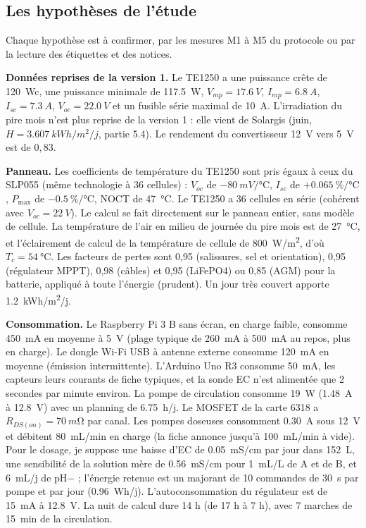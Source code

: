 \subsection{Les hypothèses de l'étude}

Chaque hypothèse est à confirmer, par les mesures M1 à M5 du protocole ou par la lecture des étiquettes et des notices.

\textbf{Données reprises de la version 1.} Le TE1250 a une puissance crête de \qty{120}{Wc}, une puissance minimale de \qty{117,5}{W}, $V_{mp} = \qty{17,6}{V}$, $I_{mp} = \qty{6,8}{A}$, $I_{sc} = \qty{7,3}{A}$, $V_{oc} = \qty{22,0}{V}$ et un fusible série maximal de \qty{10}{A}. L'irradiation du pire mois n'est plus reprise de la version 1 : elle vient de Solargis (juin, $H = \qty{3,607}{kWh/m^2/j}$, partie 5.4). Le rendement du convertisseur \qty{12}{V} vers \qty{5}{V} est de $0{,}83$.

\textbf{Panneau.} Les coefficients de température du TE1250 sont pris égaux à ceux du SLP055 (même technologie à 36 cellules) : $V_{oc}$ de $-\qty{80}{mV/\celsius}$, $I_{sc}$ de $+\qty{0,065}{\percent/\celsius}$, $P_{\max}$ de $-\qty{0,5}{\percent/\celsius}$, NOCT de \qty{47}{\celsius}. Le TE1250 a 36 cellules en série (cohérent avec $V_{oc} = \qty{22}{V}$). Le calcul se fait directement sur le panneau entier, sans modèle de cellule. La température de l'air en milieu de journée du pire mois est de \qty{27}{\celsius}, et l'éclairement de calcul de la température de cellule de \qty{800}{W/m^2}, d'où $T_c = \qty{54}{\celsius}$. Les facteurs de pertes sont 0,95 (salissures, sel et orientation), 0,95 (régulateur MPPT), 0,98 (câbles) et 0,95 (LiFePO4) ou 0,85 (AGM) pour la batterie, appliqué à toute l'énergie (prudent). Un jour très couvert apporte \qty{1,2}{kWh/m^2/j}.

\textbf{Consommation.} Le Raspberry Pi 3 B sans écran, en charge faible, consomme \qty{450}{mA} en moyenne à \qty{5}{V} (plage typique de \qty{260}{mA} à \qty{500}{mA} au repos, plus en charge). Le dongle Wi-Fi USB à antenne externe consomme \qty{120}{mA} en moyenne (émission intermittente). L'Arduino Uno R3 consomme \qty{50}{mA}, les capteurs leurs courants de fiche typiques, et la sonde EC n'est alimentée que 2 secondes par minute environ. La pompe de circulation consomme \qty{19}{W} (\qty{1,48}{A} à \qty{12,8}{V}) avec un planning de \qty{6,75}{h/j}. Le MOSFET de la carte 6318 a $R_{DS(on)} = \qty{70}{m\ohm}$ par canal. Les pompes doseuses consomment \qty{0,30}{A} sous \qty{12}{V} et débitent \qty{80}{mL/min} en charge (la fiche annonce jusqu'à \qty{100}{mL/min} à vide). Pour le dosage, je suppose une baisse d'EC de \qty{0,05}{mS/cm} par jour dans \qty{152}{L}, une sensibilité de la solution mère de \qty{0,56}{mS/cm} pour \qty{1}{mL/L} de A et de B, et \qty{6}{mL/j} de pH$-$ ; l'énergie retenue est un majorant de 10 commandes de \qty{30}{s} par pompe et par jour (\qty{0,96}{Wh/j}). L'autoconsommation du régulateur est de \qty{15}{mA} à \qty{12,8}{V}. La nuit de calcul dure 14 h (de 17 h à 7 h), avec 7 marches de \qty{15}{min} de la circulation.

